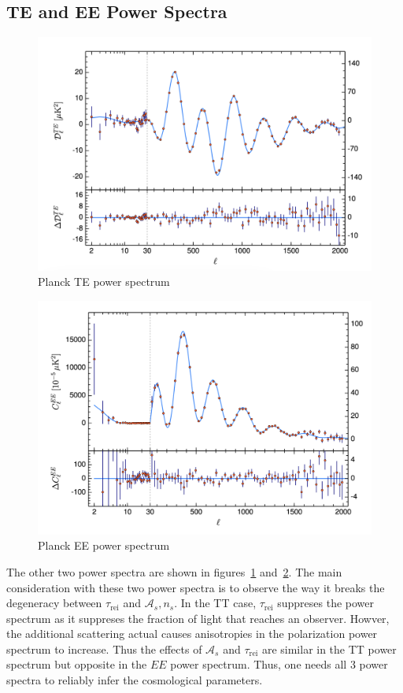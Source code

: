 \subsection{TE and EE Power Spectra}
\begin{figure}
    \centering
    \includegraphics[width=12cm]{plots/planck_TE.png}
    \caption{Planck TE power spectrum}
    \label{fig:planck_te}
\end{figure}
\begin{figure}
    \centering
    \includegraphics[width=12cm]{plots/planck_EE.png}
    \caption{Planck EE power spectrum}
    \label{fig:planck_ee}
\end{figure}
The other two power spectra are shown in figures~\ref{fig:planck_te} and~\ref{fig:planck_ee}. The main consideration with these two power spectra is to observe the way it breaks the degeneracy between $\tau_\mathrm{rei}$ and $\mathcal{A}_s,n_s$. In the TT case,  $\tau_{\mathrm{rei}}$ suppreses the power spectrum as it suppreses the fraction of light that reaches an observer. Howver, the additional scattering actual causes anisotropies in the polarization power spectrum to increase. Thus the effects of $\mathcal{A}_s$ and $\tau_\mathrm{rei}$ are similar in the TT power spectrum but opposite in the $EE$ power spectrum. Thus, one needs all 3 power spectra to reliably infer the cosmological parameters.
